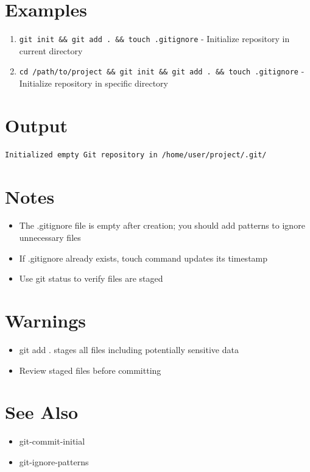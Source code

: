 \documentclass[openany]{book}
\begin{document}
\section*{Examples}
\begin{enumerate}
  \item \texttt{git init \&\& git add . \&\& touch .gitignore} - Initialize repository in current directory
  \item \texttt{cd /path/to/project \&\& git init \&\& git add . \&\& touch .gitignore} - Initialize repository in specific directory
\end{enumerate}

\section*{Output}
\begin{lstlisting}
Initialized empty Git repository in /home/user/project/.git/
\end{lstlisting}

\section*{Notes}
\begin{itemize}
  \item The .gitignore file is empty after creation; you should add patterns to ignore unnecessary files
  \item If .gitignore already exists, touch command updates its timestamp
  \item Use git status to verify files are staged
\end{itemize}

\section*{Warnings}
\begin{itemize}
  \item git add . stages all files including potentially sensitive data
  \item Review staged files before committing
\end{itemize}

\section*{See Also}
\begin{itemize}
  \item git-commit-initial
  \item git-ignore-patterns
\end{itemize}
\end{document}
